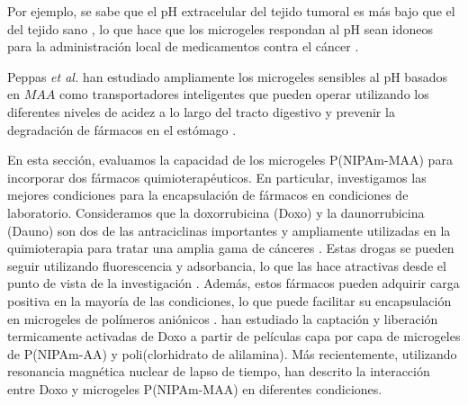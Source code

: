 Por ejemplo, se sabe que el pH extracelular del tejido tumoral es m\'as bajo que el del tejido sano \cite{Gerweck1996}, lo que hace que los microgeles respondan al pH sean idoneos para la administraci\'on local de medicamentos contra el c\'ancer \cite{Dadsetan2013}.

Peppas \emph{et al.} han estudiado ampliamente los microgeles sensibles al pH basados en $MAA$ como transportadores inteligentes que pueden operar utilizando los diferentes niveles de acidez a lo largo del tracto digestivo y prevenir la degradaci\'on de f\'armacos en el est\'omago \cite{TorresLugo2002, Carr2010, DuranLobato2014, Sharpe2018}.

En esta secci\'on, evaluamos la capacidad de los microgeles P(NIPAm-MAA) para incorporar dos f\'armacos quimioterap\'euticos. En particular, investigamos las mejores condiciones para la encapsulaci\'on de f\'armacos en condiciones de laboratorio. Consideramos que la doxorrubicina (Doxo) y la daunorrubicina (Dauno) son dos de las antraciclinas importantes y ampliamente utilizadas en la quimioterapia para tratar una amplia gama de c\'anceres \cite{Panis2012, Carvalho2009, aubel1984daunorubicin,come1999dual}. Estas drogas se pueden seguir utilizando fluorescencia y adsorbancia, lo que las hace atractivas desde el punto de vista de la investigaci\'on \cite{Serpe2005, ThanHtun2009, PerezChavez2020}. Adem\'as, estos f\'armacos pueden adquirir carga positiva en la mayor\'ia de las condiciones, lo que puede facilitar su encapsulaci\'on en microgeles de pol\'imeros ani\'onicos \cite{Li2019}. \citet{Serpe2005} han estudiado la captaci\'on y liberaci\'on termicamente activadas de Doxo a partir de pel\'iculas capa por capa de microgeles de P(NIPAm-AA) y poli(clorhidrato de alilamina). M\'as recientemente, utilizando resonancia magn\'etica nuclear de lapso de tiempo, \citet{MartinezMoro2020} han descrito la interacci\'on entre Doxo y microgeles P(NIPAm-MAA) en diferentes condiciones.
